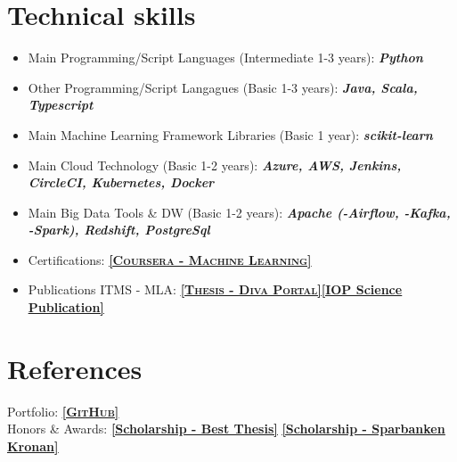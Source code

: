 \documentclass[11pt,a4paper,sans,colorlinks,linkcolor=blue,urlcolor=blue]{moderncv}
\begin{document}
\section{Technical skills}
\begin{itemize}
    \item Main Programming/Script Languages (Intermediate 1-3 years): \textbf{\textit{Python}}
        \item Other Programming/Script Langagues (Basic 1-3 years): \textbf{\textit{Java, Scala, Typescript}}
    \item Main Machine Learning Framework Libraries (Basic 1 year): \textbf{\textit{scikit-learn}}
    \item Main Cloud Technology (Basic 1-2 years): \textbf{\textit{Azure, AWS, Jenkins, CircleCI, Kubernetes, Docker}}
    \item Main Big Data Tools \& DW (Basic 1-2 years): \textbf{\textit{Apache (-Airflow, -Kafka, -Spark), Redshift, PostgreSql}}
    \item Certifications: \href{https://www.coursera.org/account/accomplishments/certificate/W5HM63ABYCDV}{\textbf{\textsc{\underline{[Coursera - Machine Learning]}}}}
    \item Publications ITMS - MLA\footnotemark[2]: \href{http://hh.diva-portal.org/smash/record.jsf?pid=diva2%3A1113511&dswid=4291#sthash.wwKv4JYI.dpbs}{\textbf{\textsc{\underline{[Thesis - Diva Portal]}}}}\href{http://iopscience.iop.org/article/10.1088/1757-899X/252/1/012018/pdf;jsessionid=EF9A9E415EC41D639019919DC566B21F.c4.iopscience.cld.iop.org}{\textbf{\underline{[IOP Science Publication]}}}
\end{itemize}
\section{References}
Portfolio: \underline{\href{https://github.com/Thelin90}{\textbf{\textsc{[GitHub]}}}}\\
Honors \& Awards: \href{https://www.hms-networks.com/work/in/sweden/hms-scholarship}{\textbf{\underline{[Scholarship - Best Thesis]}}} \href{http://www.hh.se/omhogskolan/aktuellt/nyheter/nyheter/studenterbelonasavsparbanksstiftelsenkronan.65446700.html}{\textbf{\underline{[Scholarship - Sparbanken Kronan]}}}

     
     
\vfill
\enlargethispage{\footskip}
\end{document}
